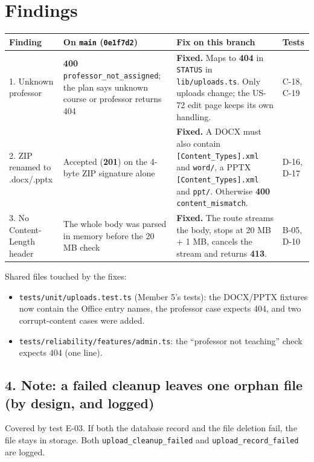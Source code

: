 \documentclass[10pt,a4paper]{article}
\begin{document}
\section*{Findings}
\begin{longtable}{@{}P{3.2cm}P{4.4cm}P{6.2cm}P{1.8cm}@{}}
\toprule \textbf{Finding} & \textbf{On \texttt{main} (\texttt{0e1f7d2})} & \textbf{Fix on this branch} & \textbf{Tests} \\ \midrule {}. Unknown professor & \textbf{400} \texttt{professor\_not\_assigned}; the plan says unknown course or professor returns 404 & \textcolor{passgreen}{\textbf{Fixed.}} Maps to \textbf{404} in \texttt{STATUS} in \texttt{lib/uploads.ts}. Only uploads change; the US-72 edit page keeps its own handling. & C-18, C-19 \\
2. ZIP renamed to .docx/.pptx & Accepted (\textbf{201}) on the 4-byte ZIP signature alone & \textcolor{passgreen}{\textbf{Fixed.}} A DOCX must also contain \texttt{[Content\_Types].xml} and \texttt{word/}, a PPTX \texttt{[Content\_Types].xml} and \texttt{ppt/}. Otherwise \textbf{400} \texttt{content\_mismatch}. & D-16, D-17 \\
3. No Content-Length header & The whole body was parsed in memory before the 20 MB check & \textcolor{passgreen}{\textbf{Fixed.}} The route streams the body, stops at 20 MB + 1 MB, cancels the stream and returns \textbf{413}. & B-05, D-10 \\
\bottomrule
\end{longtable}

Shared files touched by the fixes:
\begin{itemize}[nosep]
\item \texttt{tests/unit/uploads.test.ts} (Member 5's tests): the DOCX/PPTX fixtures now contain the Office entry names, the professor case expects 404, and two corrupt-content cases were added.
\item \texttt{tests/reliability/features/admin.ts}: the \textquotedblleft professor not teaching\textquotedblright{} check expects 404 (one line).
\end{itemize}

\subsection*{4. Note: a failed cleanup leaves one orphan file (by design, and logged)}
Covered by test E-03. If both the database record and the file deletion fail, the file stays in storage. Both \texttt{upload\_cleanup\_failed} and \texttt{upload\_record\_failed} are logged.
\end{document}
